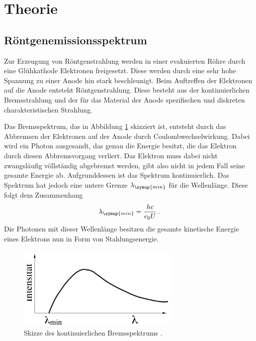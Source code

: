 \section{Theorie}
\label{sec:Theorie}

\subsection{Röntgenemissionsspektrum}
\label{sec:Theorie_emission}

Zur Erzeugung von Röntgenstrahlung werden in einer evakuierten Röhre durch eine
Glühkathode Elektronen freigesetzt. Diese werden durch eine sehr hohe Spannung zu
einer Anode hin stark beschleunigt. Beim Auftreffen der Elektronen auf die Anode
entsteht Röntgenstrahlung. Diese besteht aus der kontinuierlichen Bremsstrahlung
und der für das Material der Anode spezifischen und diskreten charakteristischen
Strahlung.

Das Bremsspektrum, das in Abbildung \ref{fig:bremsspektrum} skizziert ist, entsteht
durch das Abbremsen der Elektronen auf der Anode durch Coulombwechselwirkung. Dabei
wird ein Photon ausgesandt, das genau die Energie besitzt, die das Elektron durch
diesen Abbremsvorgang verliert. Das Elektron muss dabei nicht zwangsläufig völlständig
abgebremst werden, gibt also nicht in jedem Fall seine gesamte Energie ab. Aufgrunddessen
ist das Spektrum kontinuierlich. Das Spektrum hat jedoch eine untere Grenze $\lambda_{\symup{min}}$
für die Wellenlänge. Diese folgt dem Zusammenhang
\begin{equation}
  \lambda_{\symup{min}}=\frac{hc}{e_0 U} \,.
\end{equation}
Die Photonen mit dieser Wellenlänge besitzen die gesamte kinetische Energie eines
Elektrons nun in Form von Stahlungsenergie.

\begin{figure}
  \centering
  \includegraphics[height=4cm]{data/bremsspektrum.png}
  \caption{Skizze des kontinuierlichen Bremsspektrums \cite{Versuchsanleitung}.}
  \label{fig:bremsspektrum}
\end{figure}

